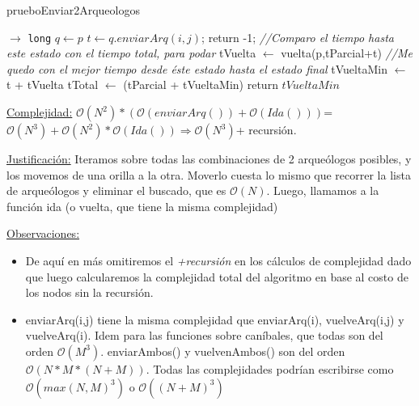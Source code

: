 \begin{algorithm}[H]
\caption{prueboEnviar2Arqueologos}
\begin{algorithmic}[1]
   $\to $ \texttt{long}
            \State $q \leftarrow p$
        	\State $t \leftarrow q.enviarArq(i,j)$;
        		\State	return -1;
        	\EndIf
        	\State \textit{//Comparo el tiempo hasta este estado con el tiempo total, para podar}
        		\State	tVuelta $\leftarrow$ vuelta(p,tParcial+t)
        		    \State \textit{//Me quedo con el mejor tiempo desde \'este estado hasta el estado final}
            		\State	tVueltaMin $\leftarrow$ t + tVuelta
            		\State  tTotal $\leftarrow$ (tParcial + tVueltaMin)
            	\EndIf
        	\EndIf
    	\EndFor
	\EndFor
	\State \State return $tVueltaMin$
 \EndProcedure
\end{algorithmic}
\underline{Complejidad:}
$\mathcal{O}(N^2) * (\mathcal{O}(enviarArq()) + \mathcal{O}(Ida()))$= $\mathcal{O}(N^3) + \mathcal{O}(N^2)*\mathcal{O}(Ida())\Rightarrow \mathcal{O}(N^3)$+ recursión.

\vspace*{5mm}
\underline{Justificación:} Iteramos sobre todas las combinaciones de 2 arqueólogos posibles, y los movemos de una orilla a la otra.
Moverlo cuesta lo mismo que recorrer la lista de arqueólogos y eliminar el buscado, que es $\mathcal{O}(N)$.
Luego, llamamos a la función ida (o vuelta, que tiene la misma complejidad)
\end{algorithm}

\underline{Observaciones:}
\begin{itemize}
    \item De aqu\'i en m\'as omitiremos el \textit{+recursi\'on} en los c\'alculos de complejidad dado que luego calcularemos la complejidad total del algoritmo en base al costo de los nodos sin la recursi\'on.
    \item enviarArq(i,j) tiene la misma complejidad que enviarArq(i), vuelveArq(i,j) y vuelveArq(i). Idem para las funciones sobre caníbales, que todas son del orden $\mathcal{O}(M^3)$. enviarAmbos() y vuelvenAmbos() son del orden $\mathcal{O}(N*M * (N+M))$. Todas las complejidades podrían escribirse como $\mathcal{O}({max(N,M)}^3)$ o $\mathcal{O}({(N + M)}^3)$
\end{itemize}

